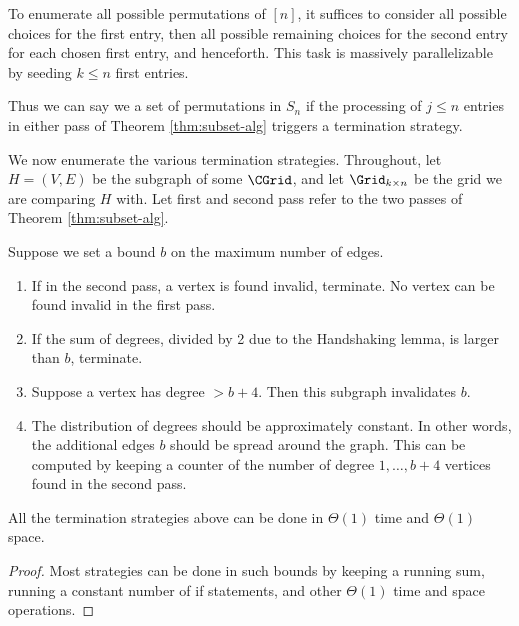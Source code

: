 \begin{fact}
To enumerate all possible permutations of $[n]$, it suffices to consider all possible choices for the first entry, then all possible remaining choices for the second entry for each chosen first entry, and henceforth. This task is massively parallelizable by seeding $k \leq n$ first entries. 

 Thus we can say we  a set of permutations in $S_n$ if the processing of $j \leq n$ entries in either pass of Theorem \ref{thm:subset-alg} triggers a termination strategy.
\end{fact}

\begin{definition}
\label{def:termination-strategies}
 We now enumerate the various termination strategies. Throughout, let $H = (V,E)$ be the subgraph of some $\CGrid$, and let $\Grid_{k \times n}$ be the grid we are comparing $H$ with. Let first and second pass refer to the two passes of Theorem \ref{thm:subset-alg}. 

Suppose we set a bound $b$ on the maximum number of edges.
\begin{enumerate}
    \item If in the second pass, a vertex is found invalid, terminate. No vertex can be found invalid in the first pass.
    \item If the sum of degrees, divided by 2 due to the Handshaking lemma, is larger than $b$, terminate.
    \item Suppose a vertex has degree $> b+4$. Then this subgraph invalidates $b$. 
    \item The distribution of degrees should be approximately constant. In other words, the additional edges $b$ should be spread around the graph. This can be computed by keeping a counter of the number of degree $1,\ldots,b+4$ vertices found in the second pass.
\end{enumerate}
\end{definition}

\begin{theorem}
All the termination strategies above can be done in $\Theta(1)$ time and $\Theta(1)$ space. 
\begin{proof}
Most strategies can be done in such bounds by keeping a running sum, running a constant number of if statements, and other $\Theta(1)$ time and space operations.
\end{proof}
\end{theorem}

